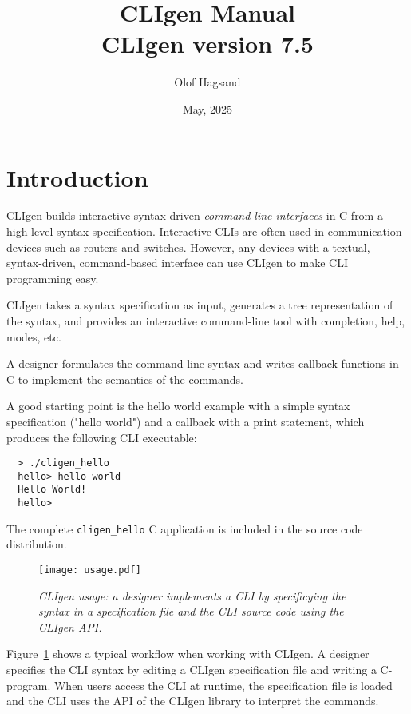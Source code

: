 \documentclass[a4paper, 10pt] {article}
\title {CLIgen Manual\\ {\small CLIgen version 7.5}}
\author{Olof Hagsand}
\begin{document}
\date{May, 2025}
\maketitle
\setcounter{tocdepth}{2}
\tableofcontents
\newpage
\section{Introduction}
\label{sec:intro}

CLIgen builds interactive syntax-driven \emph{command-line interfaces}
in C from a high-level syntax specification. Interactive CLIs are
often used in communication devices such as routers and
switches. However, any devices with a textual, syntax-driven,
command-based interface can use CLIgen to make CLI programming easy.

CLIgen takes a syntax specification as input, generates a tree
representation of the syntax, and provides an interactive command-line
tool with completion, help, modes, etc.

A designer formulates the command-line syntax and writes callback
functions in C to implement the semantics of the commands.

A good starting point is the hello world example with a simple syntax
specification ("hello world") and a callback with a print statement,
which produces the following CLI executable:

\begin{verbatim}
  > ./cligen_hello 
  hello> hello world 
  Hello World!
  hello> 
\end{verbatim}

The complete {\tt cligen\_hello} C application is included in the
source code distribution.

\begin{figure}
\centering
\texttt{[image: usage.pdf]}
\caption{\em CLIgen usage: a designer implements a CLI by specificying the syntax in a specification file and the CLI source code using the CLIgen API.}
\label{fig:usage}
\end{figure}

Figure~\ref{fig:usage} shows a typical workflow when working with
CLIgen. A designer specifies the CLI syntax by editing a CLIgen
specification file and writing a C-program. When users access the CLI
at runtime, the specification file is loaded and the CLI uses the API
of the CLIgen library to interpret the commands.
\end{document}
